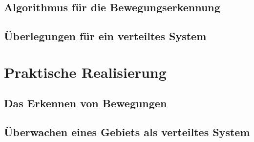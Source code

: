 \documentclass[12pt,a4paper]{scrreprt}
\begin{document}
\section{Algorithmus für die Bewegungserkennung}


\section{Überlegungen für ein verteiltes System}


\chapter{Praktische Realisierung}

\section{Das Erkennen von Bewegungen}


\section{Überwachen eines Gebiets als verteiltes System}


\printbibliography
\end{document}

